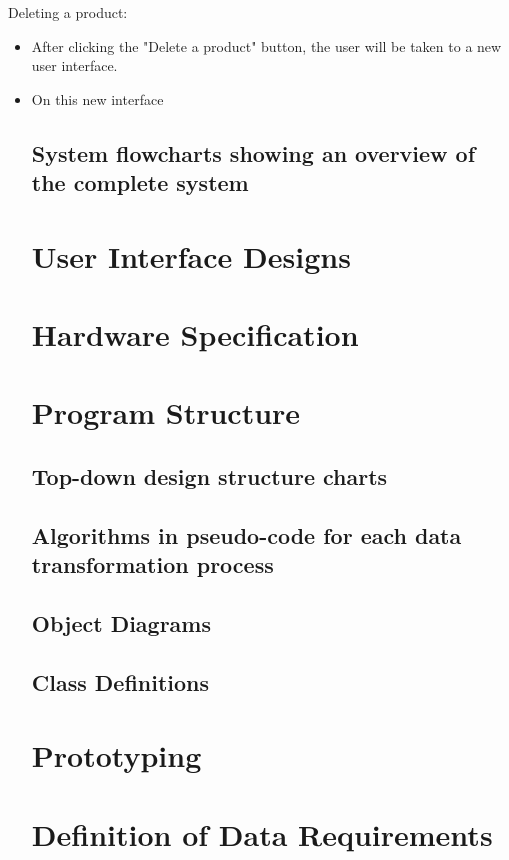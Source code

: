 Deleting a product: 
\begin{itemize}
	\item After clicking the "Delete a product" button, the user will be taken to a new user interface.
	\item On this new interface
\subsection{System flowcharts showing an overview of the complete system}

\section{User Interface Designs}

\section{Hardware Specification}

\section{Program Structure}

\subsection{Top-down design structure charts}

\subsection{Algorithms in pseudo-code for each data transformation process}

\subsection{Object Diagrams}

\subsection{Class Definitions}

\section{Prototyping}

\section{Definition of Data Requirements}


\end{itemize}
